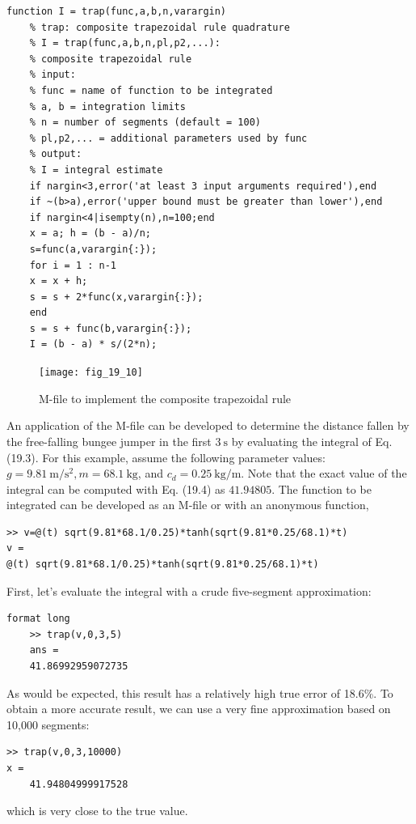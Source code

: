 \documentclass[../main.tex]{subfiles}
\begin{document}
\begin{lstlisting}[numbers=none]
	function I = trap(func,a,b,n,varargin)
	% trap: composite trapezoidal rule quadrature
	% I = trap(func,a,b,n,pl,p2,...):
	% composite trapezoidal rule
	% input:
	% func = name of function to be integrated
	% a, b = integration limits
	% n = number of segments (default = 100)
	% pl,p2,... = additional parameters used by func
	% output:
	% I = integral estimate
	if nargin<3,error('at least 3 input arguments required'),end
	if ~(b>a),error('upper bound must be greater than lower'),end
	if nargin<4|isempty(n),n=100;end
	x = a; h = (b - a)/n;
	s=func(a,varargin{:});
	for i = 1 : n-1
	x = x + h;
	s = s + 2*func(x,varargin{:});
	end
	s = s + func(b,varargin{:});
	I = (b - a) * s/(2*n);
\end{lstlisting}
\begin{figure}[H]
    \centering
    \texttt{[image: fig\_19\_10]}
   \caption{\textsf{M-file to implement the composite trapezoidal rule}}\label{fig:fig_19_10}
\end{figure}
An application of the M-file can be developed to determine the distance fallen by the free-falling bungee jumper in the first $3 \mathrm{~s}$ by evaluating the integral of Eq. (19.3). For this example, assume the following parameter values: $g=9.81 \mathrm{~m} / \mathrm{s}^{2}, m=68.1 \mathrm{~kg}$, and $c_{d}=0.25 \mathrm{~kg} / \mathrm{m}$. Note that the exact value of the integral can be computed with Eq. (19.4) as $41.94805$.
The function to be integrated can be developed as an M-file or with an anonymous
function,

\begin{lstlisting}[numbers=none]
>> v=@(t) sqrt(9.81*68.1/0.25)*tanh(sqrt(9.81*0.25/68.1)*t)
v =
@(t) sqrt(9.81*68.1/0.25)*tanh(sqrt(9.81*0.25/68.1)*t)
\end{lstlisting}

First, let's evaluate the integral with a crude five-segment approximation:

\begin{lstlisting}[numbers=none]
	format long
	>> trap(v,0,3,5)
	ans =
	41.86992959072735
\end{lstlisting}

As would be expected, this result has a relatively high true error of 18.6\%{}. To obtain a more
accurate result, we can use a very fine approximation based on 10,000 segments:

\begin{lstlisting}[numbers=none]
>> trap(v,0,3,10000)
x =
	41.94804999917528
\end{lstlisting}
which is very close to the true value.
\end{document}
